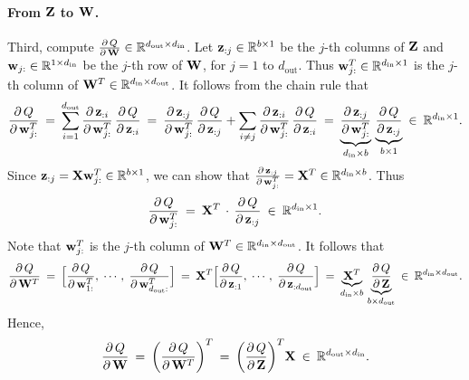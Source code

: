\documentclass[11pt]{article}
\numberwithin{equation}{section}
\def\W{{\bf W}}
\def\w{{\bf w}}
\def\X{{\bf X}}
\def\Z{{\bf Z}}
\def\z{{\bf z}}
\def\RB{{\mathbb R}}
\def\din{{d_{\textrm{in}}}}
\def\dout{{d_{\textrm{out}}}}
\begin{document}
\paragraph{From $\Z$ to $\W$.}
Third, compute $\frac{\partial \, Q}{ \partial \, \W}  \in \RB^{\dout\times \din}$.
Let $\z_{:j} \in \RB^{b\times 1}$ be the $j$-th columns of $\Z$
and $\w_{j:} \in \RB^{1\times \din}$ be the $j$-th row of $\W$, for $j = 1$ to $\dout$.
Thus $\w_{j:}^T \in \RB^{\din \times 1}$ is the $j$-th column of $\W^T \in \RB^{\din \times \dout}$.
It follows from the chain rule that
\begin{equation*}
    \frac{ \partial \, Q }{ \partial \, \w_{j:}^T }
    \: = \: \sum_{i=1}^{\dout} \frac{ \partial \, \z_{:i}  }{ \partial \, \w_{j:}^T } \, \frac{ \partial \, Q }{ \partial \, \z_{:i} } 
    \: = \: \frac{ \partial \, \z_{:j}  }{ \partial \, \w_{j:}^T } \, \frac{ \partial \, Q }{ \partial \, \z_{:j} } 
    + \sum_{i\neq j} \frac{ \partial \, \z_{:i}  }{ \partial \, \w_{j:}^T } \, \frac{ \partial \, Q }{ \partial \, \z_{:i} } 
    \: = \: \underbrace{ \frac{ \partial \, \z_{:j}  }{ \partial \, \w_{j:}^T } }_{\din \times b} 
    \,  \underbrace{ \frac{ \partial \, Q }{ \partial \, \z_{:j} } }_{b\times 1}
    \: \in \: \RB^{\din \times 1}.
\end{equation*}
Since $\z_{:j} = \X \w_{j:}^T \in \RB^{b\times 1}$, we can show that $\frac{ \partial \, \z_{:j} }{ \partial \, \w_{j:}^T } = \X^T \in  \RB^{\din \times b}$.
Thus
\begin{equation*}
    \frac{ \partial \, Q }{ \partial \, \w_{j:}^T }
    \: = \: \X^T  \, \cdot \,  \frac{ \partial \, Q }{ \partial \, \z_{:j} }
    \: \in \: \RB^{\din \times 1}.
\end{equation*}
Note that $\w_{j:}^T $ is the $j$-th column of $\W^T \in \RB^{\din \times \dout}$.
It follows that
\begin{equation*}
    \frac{ \partial \, Q }{ \partial \, \W^T }
    \: = \: \Big[ \frac{ \partial \, Q }{ \partial \, \w_{1:}^T } , \; \cdots , \;  \frac{ \partial \, Q }{ \partial \, \w_{\dout:}^T } \Big]
    \: = \:  \X^T  \Big[\frac{ \partial \, Q }{ \partial \, \z_{:1} } , \; \cdots , \; 
    \frac{ \partial \, Q }{ \partial \, \z_{:\dout} } \Big]
    \: = \: \underbrace{\X^T}_{\din \times b} \, \underbrace{ \frac{\partial \, Q }{ \partial \, \Z }}_{b\times \dout}
    \: \in \: \RB^{\din \times \dout} .
\end{equation*}
Hence,
\begin{equation} \label{eq:grad_q_w}
    \frac{ \partial \, Q }{ \partial \, \W }
    \: = \: \bigg( \frac{ \partial \, Q }{ \partial \, \W^T } \bigg)^T
    \: = \: \bigg( \frac{\partial \, Q }{ \partial \, \Z } \bigg)^T  \X 
    \: \in \: \RB^{\dout \times \din}.
\end{equation}
\end{document}
